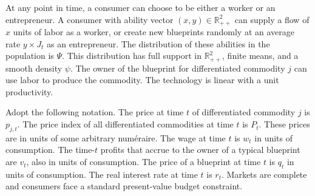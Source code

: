 \documentclass[11pt,english]{article}
\begin{document}
At any point in time, a consumer can choose to be either a worker or an
entrepreneur. A consumer with ability vector $(x, y) \in \mathbb{R}_{++}^2$
can supply a flow of $x$ units of labor as a worker, or create new blueprints
randomly at an average rate $y \times J_t$ as an entrepreneur. The
distribution of these abilities in the population is $\Psi$. This distribution
has full support in $\mathbb{R}_{++}^2$, finite means, and a smooth density
$\psi$. The owner of the blueprint for differentiated commodity $j$ can use
labor to produce the commodity. The technology is linear with a unit
productivity.
 
Adopt the following notation. The price at time $t$ of differentiated commodity
$j$ is $p_{j,t}$. The price index of all differentiated commodities at time $t$
is $P_t$. These prices are in units of some arbitrary num\'{e}raire. The wage
at time $t$ is $w_t$ in units of consumption. The time-$t$ profits that accrue
to the owner of a typical blueprint are $v_t$, also in units of consumption.
The price of a blueprint at time $t$ is $q_t$ in units of consumption. The
real interest rate at time $t$ is $r_t$. Markets are complete and consumers
face a standard present-value budget constraint.
 
\end{document}
